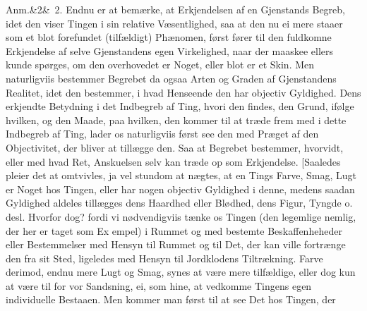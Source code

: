 \documentclass[12pt]{book}
\def\sperr#1{#1}%
\def\textit#1{#1}%
\newcommand{\sperr}[1]{\textls[180]{#1}}
\newcommand{\anm}[1]{%
  \par\vspace{0.5\baselineskip}%
  \noindent\hspace{\parindent}\sperr{Anm.}\ifx&#1&\else~\textit{#1}.\fi
  \enspace\ignorespaces
}
\newcommand{\opage}[1]{\marginnote{\footnotesize\textit{[#1]}}}
\begin{document}
\anm{2} Endnu er at bemærke, at Erkjendelsen af en Gjenstands Begreb, idet den viser
Tingen i sin relative Væsentlighed, saa at den nu ei mere staaer som et blot forefundet
(tilfældigt) Phænomen, først fører til den fuldkomne Erkjendelse af selve Gjenstandens
egen Virkelighed, naar der maaskee ellers kunde spørges, om den overhovedet er Noget,
eller blot er et Skin. Men naturligviis bestemmer Begrebet da ogsaa Arten og Graden af
Gjenstandens Realitet, idet den bestemmer, i hvad Henseende den har objectiv Gyldighed.
Dens erkjendte Betydning i det Indbegreb af Ting, hvori den findes, den Grund, ifølge
hvilken, og den Maade, paa hvilken, den kommer til at træde frem med i dette Indbegreb
af Ting, lader os naturligviis først see den med Præget af den Objectivitet, der bliver
at tillægge den. Saa at Begrebet bestemmer, hvorvidt, eller med hvad Ret, Anskuelsen
selv kan træde op som Erkjendelse. [Saaledes pleier det at omtvivles, ja vel stundom at
nægtes, at en Tings Farve, Smag, Lugt er Noget hos Tingen, eller har nogen objectiv
Gyldighed i denne, medens saadan Gyldighed aldeles tillægges dens Haardhed eller
Blødhed, dens Figur, Tyngde o. desl. Hvorfor dog? fordi vi nødvendigviis tænke os Tingen
(den legemlige nemlig, der her er taget som Ex
\opage{151} empel) i Rummet og med bestemte Beskaffenheheder eller Bestemmelser med Hensyn til
Rummet og til Det, der kan ville fortrænge den fra sit Sted, ligeledes med Hensyn til
Jordklodens Tiltrækning. Farve derimod, endnu mere Lugt og Smag, synes at være mere
tilfældige, eller dog kun at være til for vor Sandsning, ei, som hine, at vedkomme
Tingens egen individuelle Bestaaen. Men kommer man først til at see Det hos Tingen, der
\end{document}
